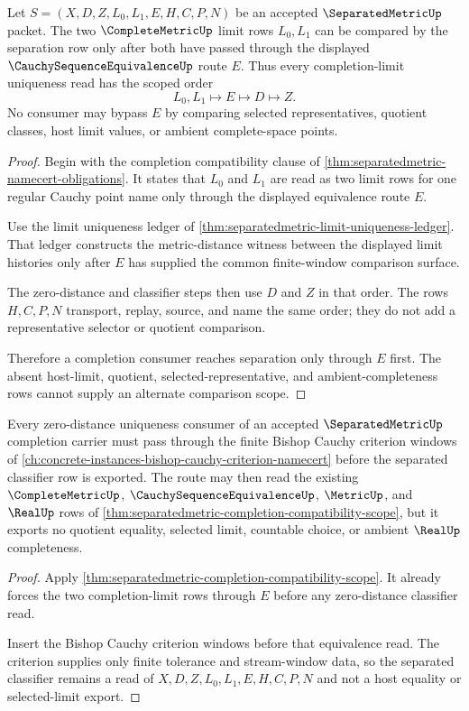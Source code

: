 \begin{theorem}\label{thm:separatedmetric-completion-compatibility-scope}
Let $S=(X,D,Z,L_0,L_1,E,H,C,P,N)$ be an accepted $\SeparatedMetricUp$ packet. The two $\CompleteMetricUp$ limit rows $L_0,L_1$ can be compared by the separation row only after both have passed through the displayed $\CauchySequenceEquivalenceUp$ route $E$. Thus every completion-limit uniqueness read has the scoped order
$$
L_0,L_1 \longmapsto E \longmapsto D \longmapsto Z .
$$
No consumer may bypass $E$ by comparing selected representatives, quotient classes, host limit values, or ambient complete-space points.
\end{theorem}
\begin{proof}
Begin with the completion compatibility clause of \autoref{thm:separatedmetric-namecert-obligations}. It states that $L_0$ and $L_1$ are read as two limit rows for one regular Cauchy point name only through the displayed equivalence route $E$.

Use the limit uniqueness ledger of \autoref{thm:separatedmetric-limit-uniqueness-ledger}. That ledger constructs the metric-distance witness between the displayed limit histories only after $E$ has supplied the common finite-window comparison surface.

The zero-distance and classifier steps then use $D$ and $Z$ in that order. The rows $H,C,P,N$ transport, replay, source, and name the same order; they do not add a representative selector or quotient comparison.

Therefore a completion consumer reaches separation only through $E$ first. The absent host-limit, quotient, selected-representative, and ambient-completeness rows cannot supply an alternate comparison scope.
\end{proof}

\begin{theorem}\label{thm:separatedmetric-bishop-cauchy-criterion-handoff}
Every zero-distance uniqueness consumer of an accepted $\SeparatedMetricUp$ completion carrier must pass through the finite Bishop Cauchy criterion windows of \autoref{ch:concrete-instances-bishop-cauchy-criterion-namecert} before the separated classifier row is exported. The route may then read the existing $\CompleteMetricUp$, $\CauchySequenceEquivalenceUp$, $\MetricUp$, and $\RealUp$ rows of \autoref{thm:separatedmetric-completion-compatibility-scope}, but it exports no quotient equality, selected limit, countable choice, or ambient $\RealUp$ completeness.
\end{theorem}
\begin{proof}
Apply \autoref{thm:separatedmetric-completion-compatibility-scope}. It already forces the two completion-limit rows through $E$ before any zero-distance classifier read.

Insert the Bishop Cauchy criterion windows before that equivalence read. The criterion supplies only finite tolerance and stream-window data, so the separated classifier remains a read of $X,D,Z,L_0,L_1,E,H,C,P,N$ and not a host equality or selected-limit export.
\end{proof}

